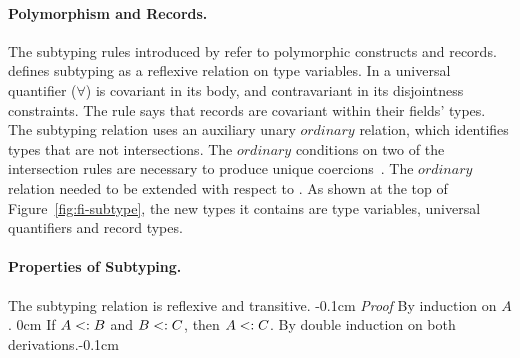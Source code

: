 
\paragraph{Polymorphism and Records.}
The subtyping rules introduced by \name refer to polymorphic constructs and records. 
 defines subtyping as a reflexive relation on type variables.
In  a universal quantifier ($\forall$) 
is covariant in its body, and contravariant in its disjointness constraints.
The  rule says that records are covariant
within their fields' types.
The subtyping relation uses an auxiliary unary $ordinary$ relation,
which identifies types that are not intersections. The $ordinary$ conditions on two of the intersection rules are necessary to 
produce unique coercions~\cite{oliveira16disjoint}. The $ordinary$
relation needed to be extended with respect to \oldname.
As shown at the top of Figure~\ref{fig:fi-subtype}, the new types it contains are 
type variables, universal quantifiers and record types.

\paragraph{Properties of Subtyping.} The subtyping relation is reflexive and transitive.
{-0.1cm}
{\noindent \emph{Proof} By induction on $A$.}
{0cm}
{If $A <: B$ and $B <: C$, then $A <: C$.}
{By double induction on both derivations.}{-0.1cm}

